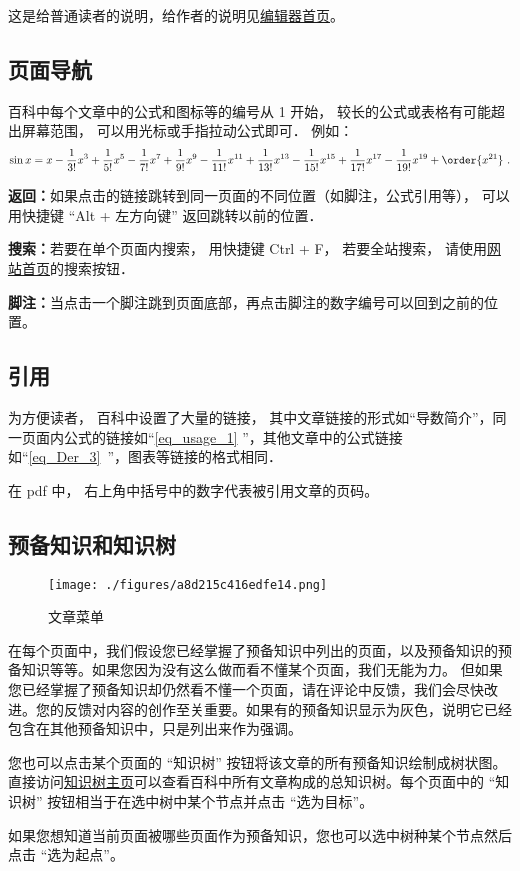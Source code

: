 
这是给普通读者的说明，给作者的说明见\href{https://wuli.wiki/editor}{编辑器首页}。

\subsection{页面导航}
百科中每个文章中的公式和图标等的编号从 1 开始， 较长的公式或表格有可能超出屏幕范围， 可以用光标或手指拉动公式即可． 例如：
\begin{equation}\label{eq_usage_1}
\sin x = x - \frac{1}{3!} x^3 + \frac{1}{5!} x^5 - \frac{1}{7!} x^7+\frac{1}{9!} x^9-\frac{1}{11!} x^{11}+\frac{1}{13!} x^{13}-\frac{1}{15!} x^{15}+\frac{1}{17!} x^{17}-\frac{1}{19!} x^{19}+ \order{x^{21}}~.
\end{equation}

\textbf{返回：}如果点击的链接跳转到同一页面的不同位置（如脚注，公式引用等）， 可以用快捷键 “Alt + 左方向键” 返回跳转以前的位置．

\textbf{搜索：}若要在单个页面内搜索， 用快捷键 Ctrl + F， 若要全站搜索， 请使用\href{https://wuli.wiki}{网站首页}的搜索按钮．

\textbf{脚注：}当点击一个脚注跳到页面底部，再点击脚注的数字编号可以回到之前的位置。

\subsection{引用}
为方便读者， 百科中设置了大量的链接， 其中文章链接的形式如“导数简介”，同一页面内公式的链接如“\autoref{eq_usage_1} ”，其他文章中的公式链接如“\autoref{eq_Der_3}~”，图表等链接的格式相同．

在 pdf 中， 右上角中括号中的数字代表被引用文章的页码。

\subsection{预备知识和知识树}
\begin{figure}[ht]
\centering
\texttt{[image: ./figures/a8d215c416edfe14.png]}
\caption{文章菜单} \label{fig_usage_2}
\end{figure}

在每个页面中，我们假设您已经掌握了预备知识中列出的页面，以及预备知识的预备知识等等。如果您因为没有这么做而看不懂某个页面，我们无能为力。 但如果您已经掌握了预备知识却仍然看不懂一个页面，请在评论中反馈，我们会尽快改进。您的反馈对内容的创作至关重要。如果有的预备知识显示为灰色，说明它已经包含在其他预备知识中，只是列出来作为强调。

您也可以点击某个页面的 “知识树” 按钮将该文章的所有预备知识绘制成树状图。 直接访问\href{https://wuli.wiki/tree/}{知识树主页}可以查看百科中所有文章构成的总知识树。每个页面中的 “知识树” 按钮相当于在选中树中某个节点并点击 “选为目标”。

如果您想知道当前页面被哪些页面作为预备知识，您也可以选中树种某个节点然后点击 “选为起点”。
